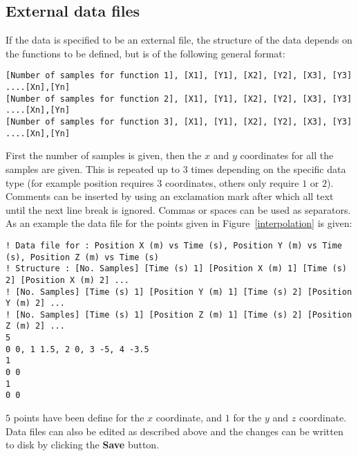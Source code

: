 \subsection{External data files}

If the data is specified to be an external file, the structure of the data
depends on the functions to be defined, but is of the following general
format:

\tiny
%
\begin{verbatim}
[Number of samples for function 1], [X1], [Y1], [X2], [Y2], [X3], [Y3] ....[Xn],[Yn]
[Number of samples for function 2], [X1], [Y1], [X2], [Y2], [X3], [Y3] ....[Xn],[Yn]
[Number of samples for function 3], [X1], [Y1], [X2], [Y2], [X3], [Y3] ....[Xn],[Yn]
\end{verbatim}

\normalsize%

First the number of samples is given, then the $x$ and $y$ coordinates for
all the samples are given. This is repeated up to $3$ times depending on the
specific data type (for example position requires $3$ coordinates, others
only require $1$ or $2$). Comments can be inserted by using an exclamation
mark after which all text until the next line break is ignored. Commas or
spaces can be used as separators. As an example the data file for the points
given in Figure~\ref{interpolation} is given:

\tiny
%
\begin{verbatim}
! Data file for : Position X (m) vs Time (s), Position Y (m) vs Time (s), Position Z (m) vs Time (s)
! Structure : [No. Samples] [Time (s) 1] [Position X (m) 1] [Time (s) 2] [Position X (m) 2] ...
! [No. Samples] [Time (s) 1] [Position Y (m) 1] [Time (s) 2] [Position Y (m) 2] ...
! [No. Samples] [Time (s) 1] [Position Z (m) 1] [Time (s) 2] [Position Z (m) 2] ...
5
0 0, 1 1.5, 2 0, 3 -5, 4 -3.5
1
0 0
1
0 0
\end{verbatim}

\normalsize%

$5$ points have been define for the $x$ coordinate, and $1$ for the $y$ and $%
z$ coordinate. Data files can also be edited as described above and the
changes can be written to disk by clicking the \textbf{Save} button.

